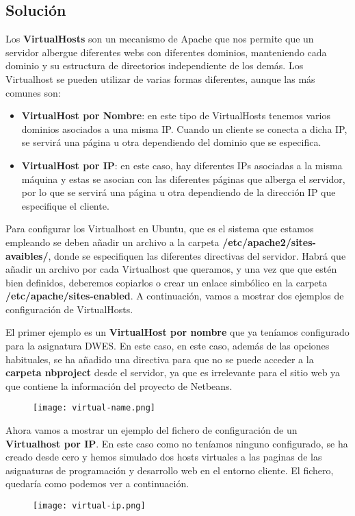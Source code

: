 \subsection{Solución}
Los \textbf{VirtualHosts} son un mecanismo de Apache que nos permite que un servidor albergue diferentes webs con diferentes dominios, manteniendo cada dominio y su estructura de directorios independiente de los demás. Los Virtualhost se pueden utilizar de varias formas diferentes, aunque las más comunes son:

\begin{itemize}
    \item \textbf{VirtualHost por Nombre}: en este tipo de VirtualHosts tenemos varios dominios asociados a una misma IP. Cuando un cliente se conecta a dicha IP, se servirá una página u otra dependiendo del dominio que se especifica.

    \item \textbf{VirtualHost por IP}: en este caso, hay diferentes IPs asociadas a la misma máquina y estas se asocian con las diferentes páginas que alberga el servidor, por lo que se servirá una página u otra dependiendo de la dirección IP que especifique el cliente.
\end{itemize}


Para configurar los Virtualhost en Ubuntu, que es el sistema que estamos empleando se deben añadir un archivo a la carpeta \textbf{/etc/apache2/sites-avaibles/}, donde se especifiquen las diferentes directivas del servidor. Habrá que añadir un archivo por cada Virtualhost que queramos, y una vez que que estén bien definidos, deberemos copiarlos o crear un enlace simbólico en la carpeta \textbf{/etc/apache/sites-enabled}. A continuación, vamos a mostrar dos ejemplos de configuración de VirtualHosts.

El primer ejemplo es un \textbf{VirtualHost por nombre} que ya teníamos configurado para la asignatura DWES. En este caso, en este caso, además de las opciones habituales, se ha añadido una directiva para que no se puede acceder a la \textbf{carpeta nbproject} desde el servidor, ya que es irrelevante para el sitio web ya que contiene la información del proyecto de Netbeans.

\begin{figure}[H]
    \centering
    \texttt{[image: virtual-name.png]}
\end{figure}

Ahora vamos a mostrar un ejemplo del fichero de configuración de un \textbf{Virtualhost por IP}. En este caso como no teníamos ninguno configurado, se ha creado desde cero y hemos simulado dos hosts virtuales a las paginas de las asignaturas de programación y desarrollo web en el entorno cliente. El fichero, quedaría como podemos ver a continuación.

\begin{figure}[H]
    \centering
    \texttt{[image: virtual-ip.png]}
\end{figure}







%
%


